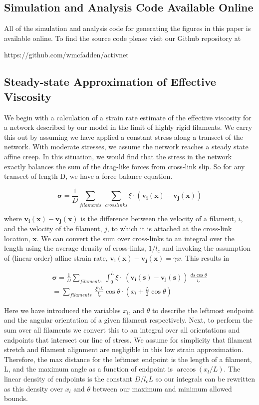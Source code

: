 \subsection{Simulation and Analysis Code Available Online}
All of the simulation and analysis code for generating the figures in this paper is available online.  To find the source code please visit our Github repository at 

https://github.com/wmcfadden/activnet

\subsection{Steady-state Approximation of Effective Viscosity}
\label{sec:eff_vic}
We begin with a calculation of a strain rate estimate of the effective viscosity for a network described by our model in the limit of highly rigid filaments.  We carry this out by assuming we have applied a constant stress along a transect of the network.  With moderate stresses, we assume the network reaches a steady state affine creep. In this situation, we would find that the stress in the network exactly balances the sum of the drag-like forces from cross-link slip.  So for any transect of length D, we have a force balance equation.

\begin{equation}
	\mathbf{\sigma} = \frac{1}{D}\sum_{filaments}\: \sum_{crosslinks}\xi \cdot (\mathbf{v_i(x)}-\mathbf{v_j(x)})
\end{equation}

where $\mathbf{v_i(x)}-\mathbf{v_j(x)}$ is the difference between the velocity of a filament, $i$, and the velocity of the filament, $j$, to which it is attached at the cross-link location, $\mathbf{x}$. We can convert the sum over cross-links to an integral over the length using the average density of cross-links, $1/l_c$ and invoking the assumption of (linear order) affine strain rate, $\mathbf{v_i(x)}-\mathbf{v_j(x)}=\dot \gamma x$. This results in

\begin{multline}
	\mathbf{\sigma} =  \frac{1}{D}\sum_{filaments}\:  \int_0^L \xi \cdot  \: (\mathbf{v_i(s)}-\mathbf{v_j(s)}) \:\frac{ds \cos \theta }{l_c} \\
	= \sum_{filaments}\:  \frac{\xi \dot \gamma L}{l_c} \cos \theta \cdot (x_l + \frac{L}{2} \cos \theta)
\end{multline}

Here we have introduced the variables $x_l$, and $\theta$ to describe the leftmost endpoint and the angular orientation of a given filament respectively.  Next, to perform the sum over all filaments we convert this to an integral over all orientations and endpoints that intersect our line of stress. We assume for simplicity that filament stretch and filament alignment are negligible in this low strain approximation.  Therefore, the max distance for the leftmost endpoint is the length of a filament, L, and the maximum angle as a function of endpoint is $\arccos(x_l/L)$.  The linear density of endpoints is the constant $D/l_cL$ so our integrals can be rewritten as this density over $x_l$ and $\theta$ between our maximum and minimum allowed bounds.

